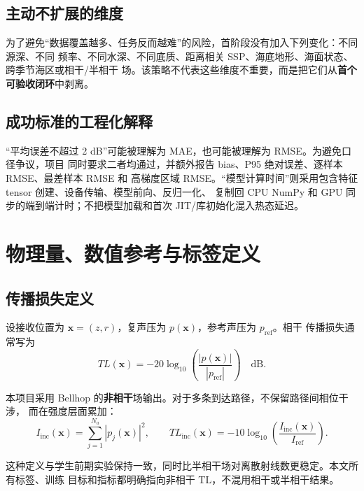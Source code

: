 \documentclass[UTF8,12pt,openany]{ctexrep}
\begin{document}
\section{主动不扩展的维度}

为了避免“数据覆盖越多、任务反而越难”的风险，首阶段没有加入下列变化：不同源深、不同
频率、不同水深、不同底质、距离相关 SSP、海底地形、海面状态、跨季节海区或相干/半相干
场。该策略不代表这些维度不重要，而是把它们从\textbf{首个可验收闭环}中剥离。

\section{成功标准的工程化解释}

“平均误差不超过 2 dB”可能被理解为 MAE，也可能被理解为 RMSE。为避免口径争议，项目
同时要求二者均通过，并额外报告 bias、P95 绝对误差、逐样本 RMSE、最差样本 RMSE 和
高梯度区域 RMSE。“模型计算时间”则采用包含特征 tensor 创建、设备传输、模型前向、反归一化、
复制回 CPU NumPy 和 GPU 同步的端到端计时；不把模型加载和首次 JIT/库初始化混入热态延迟。

\chapter{物理量、数值参考与标签定义}
\label{chap:physics}

\section{传播损失定义}

设接收位置为 $\bm{x}=(z,r)$，复声压为 $p(\bm{x})$，参考声压为 $p_{\mathrm{ref}}$。相干
传播损失通常写为
\begin{equation}
  TL(\bm{x})=-20\log_{10}\left(\frac{|p(\bm{x})|}{|p_{\mathrm{ref}}|}\right)\quad\text{dB}.
\end{equation}

本项目采用 Bellhop 的\textbf{非相干}场输出。对于多条到达路径，不保留路径间相位干涉，
而在强度层面累加：
\begin{equation}
  I_{\mathrm{inc}}(\bm{x})=\sum_{j=1}^{N_a}|p_j(\bm{x})|^2,
  \qquad
  TL_{\mathrm{inc}}(\bm{x})=-10\log_{10}\left(\frac{I_{\mathrm{inc}}(\bm{x})}{I_{\mathrm{ref}}}\right).
\end{equation}

这种定义与学生前期实验保持一致，同时比半相干场对离散射线数更稳定。本文所有标签、训练
目标和指标都明确指向非相干 TL，不混用相干或半相干结果。
\end{document}
